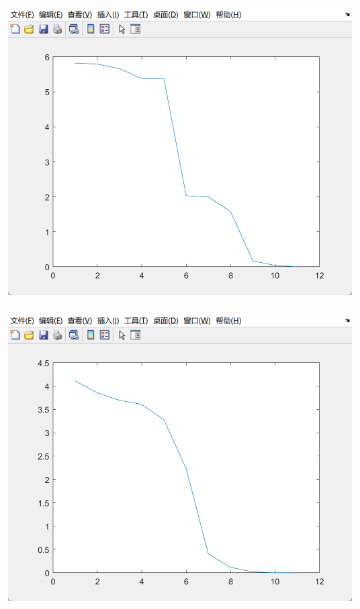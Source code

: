 \documentclass[11pt]{ctexart}
\begin{document}
    \begin{figure}[H]
        \centering
        \begin{subfigure}[t]{0.3\textwidth}
            \centering
            \includegraphics[width=\textwidth]{./picture/exp1_3_1}
            \caption{}
            \label{fig:a}
        \end{subfigure}
        \begin{subfigure}[t]{0.3\textwidth}
            \centering
            \includegraphics[width=\textwidth]{./picture/exp1_3_2}
            \caption{}

\end{subfigure}
\end{figure}
\end{document}
